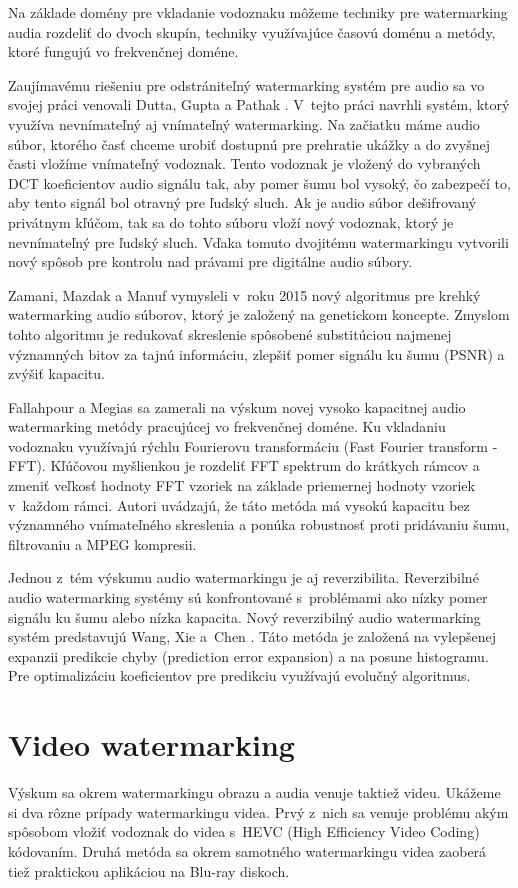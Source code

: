 Na základe domény pre vkladanie vodoznaku môžeme techniky pre watermarking audia rozdeliť do dvoch skupín, techniky využívajúce časovú doménu a metódy, ktoré fungujú vo frekvenčnej doméne. \cite{Fallahpour}

Zaujímavému riešeniu pre odstrániteľný watermarking systém pre audio sa vo svojej práci venovali Dutta, Gupta a Pathak \cite{Dutta2014}. V~tejto práci navrhli systém, ktorý využíva nevnímateľný aj vnímateľný watermarking. Na začiatku máme audio súbor, ktorého časť chceme urobiť dostupnú pre prehratie ukážky a do zvyšnej časti vložíme vnímateľný vodoznak. Tento vodoznak je vložený do vybraných DCT koeficientov audio signálu tak, aby pomer šumu bol vysoký, čo zabezpečí to, aby tento signál bol otravný pre ľudský sluch. Ak je audio súbor dešifrovaný privátnym kľúčom, tak sa do tohto súboru vloží nový vodoznak, ktorý je nevnímateľný pre ľudský sluch. Vďaka tomuto dvojitému watermarkingu vytvorili nový spôsob pre kontrolu nad právami pre digitálne audio súbory.

Zamani, Mazdak a Manuf \cite{Zamani2015} vymysleli v~roku 2015 nový algoritmus pre krehký watermarking audio súborov, ktorý je založený na genetickom koncepte. Zmyslom tohto algoritmu je redukovať skreslenie spôsobené substitúciou najmenej významných bitov za tajnú informáciu, zlepšiť pomer signálu ku šumu (PSNR) a zvýšiť kapacitu.

Fallahpour a Megias \cite{Fallahpour} sa zamerali na výskum novej vysoko kapacitnej audio watermarking metódy pracujúcej vo frekvenčnej doméne. Ku vkladaniu vodoznaku využívajú rýchlu Fourierovu transformáciu (Fast Fourier transform - FFT). Kľúčovou myšlienkou je rozdeliť FFT spektrum do krátkych rámcov a zmeniť veľkosť hodnoty FFT vzoriek na základe priemernej hodnoty vzoriek v~každom rámci. Autori uvádzajú, že táto metóda má vysokú kapacitu bez významného vnímateľného skreslenia a ponúka robustnosť proti pridávaniu šumu, filtrovaniu a MPEG kompresii.

Jednou z~tém výskumu audio watermarkingu je aj reverzibilita. Reverzibilné audio watermarking systémy sú konfrontované s~problémami ako nízky pomer signálu ku šumu alebo nízka kapacita. Nový reverzibilný audio watermarking systém predstavujú Wang, Xie a~Chen \cite{Wang2014}. Táto metóda je založená na vylepšenej expanzii predikcie chyby (prediction error expansion) a na posune histogramu. Pre optimalizáciu koeficientov pre predikciu využívajú evolučný algoritmus.

\section{Video watermarking}
Výskum sa okrem watermarkingu obrazu a audia venuje taktiež videu. Ukážeme si dva rôzne prípady watermarkingu videa. Prvý z~nich sa venuje problému akým spôsobom vložiť vodoznak do videa s~HEVC (High Efficiency Video Coding) kódovaním. Druhá metóda sa okrem samotného watermarkingu videa zaoberá tiež praktickou aplikáciou na Blu-ray diskoch.

